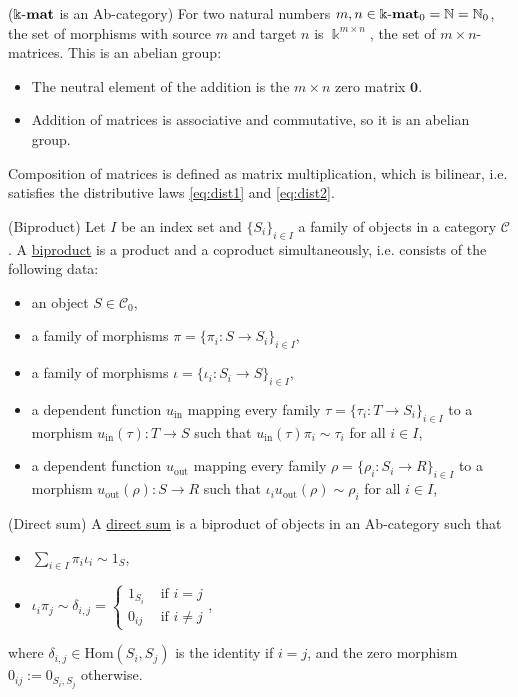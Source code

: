 \begin{example}{($\Bbbk\textnormal{-}\mathbf{mat}$ is an Ab-category)}
For two natural numbers $m,n \in {\Bbbk\textnormal{-}\mathbf{mat}}_{0} = \mathbb{N} = \mathbb{N}_{0}$, the set of morphisms with source $m$ and target $n$ is
$\Bbbk^{m\times n}$, the set of $m \times n$-matrices. This is an abelian group:
\begin{itemize}
\item The neutral element of the addition is the $m \times n$ zero matrix $\mathbf{0}$.
\item Addition of matrices is associative and commutative, so it is an abelian group.
\end{itemize}
Composition of matrices is defined as matrix multiplication, which is bilinear, i.e. satisfies the distributive laws \eqref{eq:dist1} and \eqref{eq:dist2}.
\end{example}

\begin{definition}{(Biproduct)}\label{def:biproduct}
Let $I$ be an index set and $\{S_{i}\}_{i\in I}$ a family of objects in a category $\mathcal{C}$.
A \ul{biproduct} is a product and a coproduct simultaneously, i.e. consists of the following data:
\begin{itemize}
\item an object $S \in \mathcal{C}_{0}$,
\item a family of morphisms $\pi = \{ \pi_{i} : S \rightarrow S_{i} \}_{i\in I}$,
\item a family of morphisms $\iota = \{ \iota_{i} : S_{i} \rightarrow S \}_{i\in I}$,
\item a dependent function $u_{\text{in}}$ mapping every family $\tau = \{ \tau_{i} : T \rightarrow S_{i} \}_{i\in I}$ to a morphism
$u_{\text{in}}(\tau) : T \rightarrow S$ such that $u_{\text{in}}(\tau) \pi_{i} \sim \tau_{i}$ for all $i \in I$,
\item a dependent function $u_{\text{out}}$ mapping every family $\rho = \{ \rho_{i} : S_{i} \rightarrow R \}_{i\in I}$ to a morphism
$u_{\text{out}}(\rho) : S \rightarrow R$ such that $\iota_{i} u_{\text{out}}(\rho) \sim \rho_{i}$ for all $i \in I$,
\end{itemize}
\end{definition}

\begin{definition}{(Direct sum)}\label{def:direct_sum}
A \ul{direct sum} is a biproduct of objects in an Ab-category such that
\begin{itemize}
\item $\sum_{i\in I}  \pi_{i} \iota_{i} \sim 1_{S}$,
\item $ \iota_{i} \pi_{j} \sim \delta_{i, j} =  \begin{cases}
            1_{S_{i}} & \text{ if } i = j  \\
            0_{ij} & \text{ if } i \neq j
        \end{cases}$,
\end{itemize}
where $\delta_{i, j} \in \mathrm{Hom}(S_{i}, S_{j})$ is the identity if $i = j$, and the zero morphism $0_{ij} := 0_{S_{i}, S_{j}}$ otherwise.
\end{definition}

